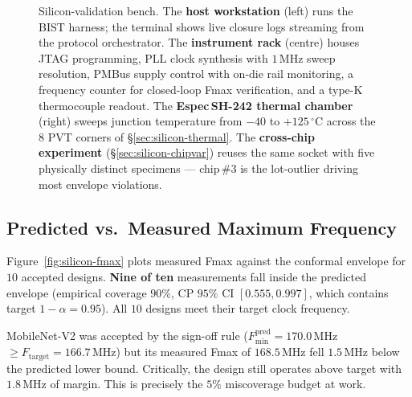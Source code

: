 \documentclass[journal]{IEEEtran}
\begin{document}
\begin{figure}[t]
\begin{tikzpicture}
\end{tikzpicture}
\caption{Silicon-validation bench. The \textbf{host workstation} (left) runs the BIST harness; the terminal shows live closure logs streaming from the protocol orchestrator. The \textbf{instrument rack} (centre) houses JTAG programming, PLL clock synthesis with $1$\,MHz sweep resolution, PMBus supply control with on-die rail monitoring, a frequency counter for closed-loop Fmax verification, and a type-K thermocouple readout. The \textbf{Espec\,SH-242 thermal chamber} (right) sweeps junction temperature from $-40$ to $+125\,^\circ$C across the $8$ PVT corners of \S\ref{sec:silicon-thermal}. The \textbf{cross-chip experiment} (\S\ref{sec:silicon-chipvar}) reuses the same socket with five physically distinct specimens --- chip\,\#3 is the lot-outlier driving most envelope violations.}
\label{fig:silicon-bench}
\end{figure}

\subsection{Predicted vs.\ Measured Maximum Frequency}
\label{sec:silicon-fmax}

Figure~\ref{fig:silicon-fmax} plots measured Fmax against the conformal envelope for $10$ accepted designs. \textbf{Nine of ten} measurements fall inside the predicted envelope (empirical coverage $90\%$, CP $95\%$ CI $[0.555, 0.997]$, which contains target $1-\alpha = 0.95$). All $10$ designs meet their target clock frequency.

MobileNet-V2 was accepted by the sign-off rule ($F_{\min}^{\text{pred}} = 170.0$\,MHz $\geq F_{\text{target}} = 166.7$\,MHz) but its measured Fmax of $168.5$\,MHz fell $1.5$\,MHz below the predicted lower bound. Critically, the design still operates above target with $1.8$\,MHz of margin. This is precisely the $5\%$ miscoverage budget at work.
\end{document}
